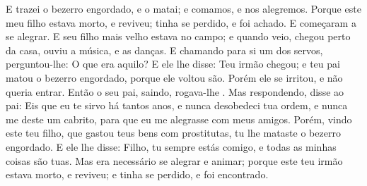 {  E trazei o bezerro engordado, e o matai; e comamos, e nos alegremos.
  Porque este meu filho estava morto, e reviveu; tinha se perdido, e foi achado. E começaram a se alegrar.
  E seu filho mais velho estava no campo; e quando veio, chegou perto da casa, ouviu a música, e as danças.
  E chamando para si um dos servos, perguntou-lhe: O que era aquilo?
  E ele lhe disse: Teu irmão chegou; e teu pai matou o bezerro engordado, porque ele voltou são.
  Porém ele se irritou, e não queria entrar. Então o seu pai, saindo, rogava-lhe
{} .
  Mas
{} respondendo, disse ao pai: Eis que eu te sirvo há tantos anos, e nunca desobedeci tua ordem, e nunca me deste um cabrito, para que eu me alegrasse com meus amigos.
  Porém, vindo este teu filho, que gastou teus bens com prostitutas, tu lhe mataste o bezerro engordado.
  E ele lhe disse: Filho, tu sempre estás comigo, e todas as minhas coisas são tuas.
  Mas era necessário se alegrar e animar; porque este teu irmão estava morto, e reviveu; e tinha se perdido, e foi encontrado.
\par }

